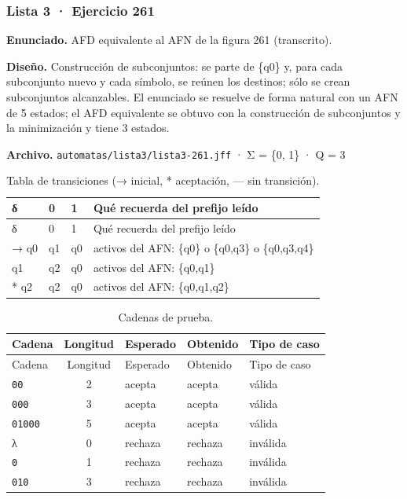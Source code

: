 
\hypertarget{lista-3-ejercicio-261}{%
\subsubsection{Lista 3 · Ejercicio 261}\label{lista-3-ejercicio-261}}

\textbf{Enunciado.} AFD equivalente al AFN de la figura 261 (transcrito).

\textbf{Diseño.} Construcción de subconjuntos: se parte de \{q0\} y, para cada subconjunto nuevo y cada símbolo, se reúnen los destinos; sólo se crean subconjuntos alcanzables. El enunciado se resuelve de forma natural con un AFN de 5 estados; el AFD equivalente se obtuvo con la construcción de subconjuntos y la minimización y tiene 3 estados.

\textbf{Archivo.} \texttt{automatas/lista3/lista3-261.jff} · Σ = \{0, 1\} · \textbar Q\textbar{} = 3

\begin{longtable}[]{@{}llll@{}}
\caption{Tabla de transiciones (→ inicial, * aceptación, --- sin transición).}\tabularnewline
\toprule\noalign{}
δ & 0 & 1 & Qué recuerda del prefijo leído \\
\midrule\noalign{}
\endfirsthead
\toprule\noalign{}
δ & 0 & 1 & Qué recuerda del prefijo leído \\
\midrule\noalign{}
\endhead
\bottomrule\noalign{}
\endlastfoot
→ q0 & q1 & q0 & activos del AFN: \{q0\} o \{q0,q3\} o \{q0,q3,q4\} \\
q1 & q2 & q0 & activos del AFN: \{q0,q1\} \\
* q2 & q2 & q0 & activos del AFN: \{q0,q1,q2\} \\
\end{longtable}

\begin{longtable}[]{@{}lclll@{}}
\caption{Cadenas de prueba.}\tabularnewline
\toprule\noalign{}
Cadena & Longitud & Esperado & Obtenido & Tipo de caso \\
\midrule\noalign{}
\endfirsthead
\toprule\noalign{}
Cadena & Longitud & Esperado & Obtenido & Tipo de caso \\
\midrule\noalign{}
\endhead
\bottomrule\noalign{}
\endlastfoot
\texttt{00} & 2 & acepta & acepta & válida \\
\texttt{000} & 3 & acepta & acepta & válida \\
\texttt{01000} & 5 & acepta & acepta & válida \\
λ & 0 & rechaza & rechaza & inválida \\
\texttt{0} & 1 & rechaza & rechaza & inválida \\
\texttt{010} & 3 & rechaza & rechaza & inválida \\
\end{longtable}

